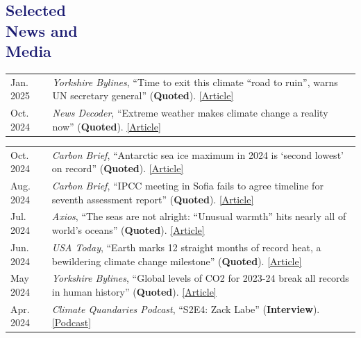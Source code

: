 \documentclass[margin,line,palatino,courier,10pt]{res}
\begin{document}
\begin{resume}
\section{\sc \textcolor{MidnightBlue}{\large{\textbf{Selected\\ News and\\ Media}}}}
\vspace*{0.04in}
\begin{tabular}{@{}p{0.9in}p{4in}}
Jan. 2025 & \textit{Yorkshire Bylines}, ``Time to exit this climate ``road to ruin'', warns UN secretary general'' (\textbf{Quoted}). \href{https://yorkshirebylines.co.uk/news/environment/time-to-exit-this-climate-road-to-ruin-warns-un-secretary-general/}{[Article]}\\
Oct. 2024 & \textit{News Decoder}, ``Extreme weather makes climate change a reality now'' (\textbf{Quoted}). \href{https://news-decoder.com/extreme-weather-makes-climate-change-a-reality-now/}{[Article]}\\
\end{tabular}
\begin{tabular}{@{}p{0.9in}p{4in}}
Oct. 2024 & \textit{Carbon Brief}, ``Antarctic sea ice maximum in 2024 is ‘second lowest’ on record'' (\textbf{Quoted}). \href{https://www.carbonbrief.org/antarctic-sea-ice-maximum-in-2024-is-second-lowest-on-record/}{[Article]}\\
Aug. 2024 & \textit{Carbon Brief}, ``IPCC meeting in Sofia fails to agree timeline for seventh assessment report'' (\textbf{Quoted}). \href{https://www.carbonbrief.org/ipcc-meeting-in-sofia-fails-to-agree-timeline-for-seventh-assessment-report/}{[Article]}\\
Jul. 2024 & \textit{Axios}, ``The seas are not alright: ``Unusual warmth'' hits nearly all of world's oceans'' (\textbf{Quoted}). \href{https://www.axios.com/2024/07/26/ocean-temperatures-extreme-heat-records}{[Article]}\\
Jun. 2024 & \textit{USA Today}, ``Earth marks 12 straight months of record heat, a bewildering climate change milestone'' (\textbf{Quoted}). \href{https://www.usatoday.com/story/news/weather/2024/06/05/global-heat-records-set-12-months-in-a-row-fueled-by-climate-change/73907161007/}{[Article]}\\
May 2024 & \textit{Yorkshire Bylines}, ``Global levels of CO2 for 2023-24 break all records in human history'' (\textbf{Quoted}). \href{https://yorkshirebylines.co.uk/news/environment/co2-levels-break-all-records-in-human-history/}{[Article]}\\
Apr. 2024 & \textit{Climate Quandaries Podcast}, ``S2E4: Zack Labe'' (\textbf{Interview}). \href{https://open.spotify.com/episode/6RoWS9wThvWm2qc48f0rhj?si=0qvnBFuhSyKkts0oeR4CKA}{[Podcast]}\\

\end{tabular}
\end{resume}
\end{document}
